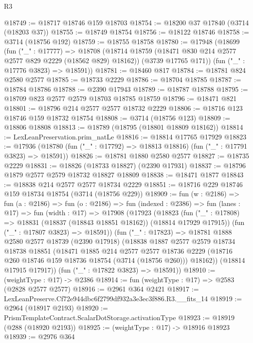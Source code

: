 \begin{lexlean}{R3}
\begin{coremodule}
@18749 := @18717 @18746 @159 @18703
@18754 := @18200 @37 @17840 (@3714 (@18203 @37))
@18755 := @18749 @18754
@18756 := @18122 @18746
@18758 := @3714 (@18756 @192)
@18759 := @18755 @18758
@18780 := @17948
    (@18699
      (fun ("_" : @17777) =>
      @18708
        (@18714 @18759 (@18471 @830 @214 @2577 @2577 @829 @2229 (@18562 @829) @18162))
        (@3739 @17765 @171))
      (fun ("_" : @17776 @3823) => @18591))
@18781 := @18460 @817
@18784 := @18781 @824 @2580 @2577
@18785 := @18733 @2229
@18786 := @18704 @18785
@18787 := @18784 @18786
@18788 := @2390 @17943
@18789 := @18787 @18788
@18795 := @18709 @823 @2577 @2579 @18703 @18785 @18759
@18796 := @18471 @821
@18801 := @18796 @214 @2577 @2577 @18732 @2229
@18806 := @18716 @123 @18746 @159 @18732 @18754
@18808 := @3714 (@18756 @123)
@18809 := @18806 @18808
@18813 := @18789 (@18795 (@18801 @18809 @18162))
@18814 := LexLeanPreservation.prim_natLe
@18816 := @18814 @17765 @17929
@18823 := @17936 (@18780 (fun ("_" : @17792) => @18813 @18816) (fun ("_" : @17791 @3823) => @18591))
@18826 := @18781 @1880 @2580 @2577
@18827 := @18735 @2229
@18831 := @18826 (@18733 @18827) (@2390 @17931)
@18837 := @18796 @1879 @2577 @2579 @18732 @18827 @18809
@18838 := @18471 @1877
@18843 := @18838 @214 @2577 @2577 @18734 @2229
@18851 := @18716 @229 @18746 @159 @18734 @18754 (@3714 (@18756 @229))
@18909 := fun (w : @2186) =>
  fun (a : @2186) =>
  fun (o : @2186) =>
  fun (indexed : @2386) =>
  fun (lanes : @17) =>
  fun (width : @17) =>
  @17908
    (@17923
      (@18823
        (fun ("_" : @17808) => @18831 (@18837 (@18843 @18851 @18162)) (@18814 @17929 @17915))
        (fun ("_" : @17807 @3823) => @18591))
      (fun ("_" : @17823) =>
      @18781
        @1888
        @2580
        @2577
        @18739
        (@2390 @17918)
        (@18838
          @1887
          @2577
          @2579
          @18734
          @18738
          @18851
          (@18471
            @1885
            @214
            @2577
            @2577
            @18736
            @2229
            (@18716 @260 @18746 @159 @18736 @18754 (@3714 (@18756 @260)))
            @18162))
        (@18814 @17915 @17917))
      (fun ("_" : @17822 @3823) => @18591))
@18910 := (weightType : @17) -> @2386
@18914 := fun (weightType : @17) => @2583 (@2828 @2577 @2577)
@18916 := @2961 @364 @2421
@18917 := LexLeanPreserve.Cf72e944dbc6f2799df932a3e3ec3f886.R3.__fits_14
@18919 := @2964 (@18917 @2193)
@18920 := PrismTemplateContract.ScalarDotStorage.activationType
@18923 := @18919 (@288 (@18920 @2193))
@18925 := (weightType : @17) -> @18916 @18923
@18939 := @2976
    @364

\end{coremodule}
\end{lexlean}
